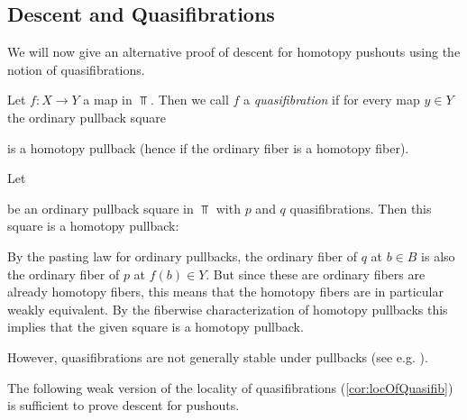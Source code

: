 \subsection*{Descent and Quasifibrations}
We will now give an alternative proof of descent for homotopy pushouts using the notion of quasifibrations.
\begin{definition}[Quasifibration]
    Let $f\colon X\to Y$ a map in $\Top$.
    Then we call $f$ a \emph{quasifibration} if for every map $y\in Y$ the ordinary pullback square
    \begin{center}
    \end{center}
    is a homotopy pullback (hence if the ordinary fiber is a homotopy fiber).
\end{definition}
\begin{remark}\label{rmk:parallelQuasifibsInPb}
    Let 
    \begin{center}
    \end{center}
    be an ordinary pullback square in $\Top$ with $p$ and $q$ quasifibrations.
    Then this square is a homotopy pullback:
    
    By the pasting law for ordinary pullbacks, the ordinary fiber of $q$ at $b\in B$ is also the ordinary fiber of $p$ at $f(b)\in Y$.
    But since these are ordinary fibers are already homotopy fibers, this means that the homotopy fibers are in particular weakly equivalent.
    By the fiberwise characterization of homotopy pullbacks this implies that the given square is a homotopy pullback.

    However, quasifibrations are not generally stable under pullbacks (see e.g. \cite[Example 2.7.6]{cubical_htpy_theory}).
\end{remark}
The following weak version of the locality of quasifibrations (\cref{cor:locOfQuasifib}) is sufficient to prove descent for pushouts.
